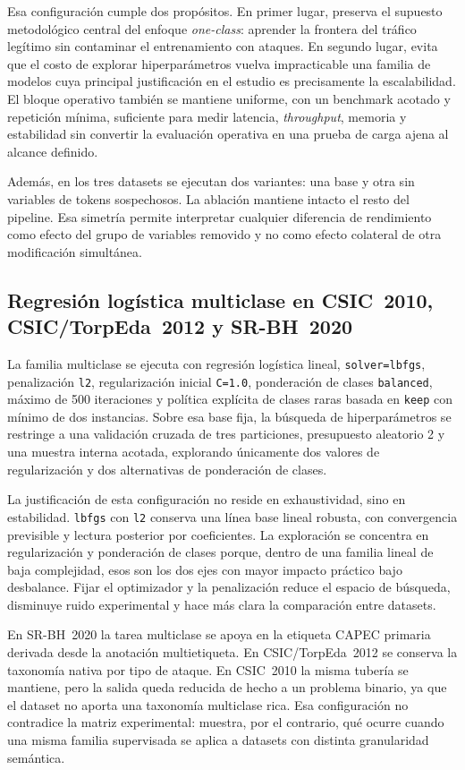 \documentclass[12pt,oneside]{report}
\begin{document}
Esa configuración cumple dos propósitos. En primer lugar, preserva el supuesto metodológico central del enfoque \textit{one-class}: aprender la frontera del tráfico legítimo sin contaminar el entrenamiento con ataques. En segundo lugar, evita que el costo de explorar hiperparámetros vuelva impracticable una familia de modelos cuya principal justificación en el estudio es precisamente la escalabilidad. El bloque operativo también se mantiene uniforme, con un benchmark acotado y repetición mínima, suficiente para medir latencia, \textit{throughput}, memoria y estabilidad sin convertir la evaluación operativa en una prueba de carga ajena al alcance definido.

Además, en los tres datasets se ejecutan dos variantes: una base y otra sin variables de tokens sospechosos. La ablación mantiene intacto el resto del pipeline. Esa simetría permite interpretar cualquier diferencia de rendimiento como efecto del grupo de variables removido y no como efecto colateral de otra modificación simultánea.

\subsection{Regresión logística multiclase en CSIC~2010, CSIC/TorpEda~2012 y SR-BH~2020}
La familia multiclase se ejecuta con regresión logística lineal, \texttt{solver=lbfgs}, penalización \texttt{l2}, regularización inicial \texttt{C=1.0}, ponderación de clases \texttt{balanced}, máximo de 500 iteraciones y política explícita de clases raras basada en \texttt{keep} con mínimo de dos instancias. Sobre esa base fija, la búsqueda de hiperparámetros se restringe a una validación cruzada de tres particiones, presupuesto aleatorio 2 y una muestra interna acotada, explorando únicamente dos valores de regularización y dos alternativas de ponderación de clases.

La justificación de esta configuración no reside en exhaustividad, sino en estabilidad. \texttt{lbfgs} con \texttt{l2} conserva una línea base lineal robusta, con convergencia previsible y lectura posterior por coeficientes. La exploración se concentra en regularización y ponderación de clases porque, dentro de una familia lineal de baja complejidad, esos son los dos ejes con mayor impacto práctico bajo desbalance. Fijar el optimizador y la penalización reduce el espacio de búsqueda, disminuye ruido experimental y hace más clara la comparación entre datasets.

En SR-BH~2020 la tarea multiclase se apoya en la etiqueta CAPEC primaria derivada desde la anotación multietiqueta. En CSIC/TorpEda~2012 se conserva la taxonomía nativa por tipo de ataque. En CSIC~2010 la misma tubería se mantiene, pero la salida queda reducida de hecho a un problema binario, ya que el dataset no aporta una taxonomía multiclase rica. Esa configuración no contradice la matriz experimental: muestra, por el contrario, qué ocurre cuando una misma familia supervisada se aplica a datasets con distinta granularidad semántica.
\end{document}
